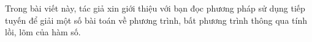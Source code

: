 \thispagestyle{hoccungpinone}
\pagestyle{hoccungpi}
\everymath{\color{hoccungpi}}
\graphicspath{{../hoccungpi/pic/}}
\begingroup
{}
\centering
\endgroup
\vspace*{192pt}

Trong bài viết này, tác giả xin giới thiệu với bạn đọc phương pháp sử dụng tiếp tuyến để giải một số bài toán về phương trình, bất phương trình thông qua tính lồi, lõm của hàm số.

